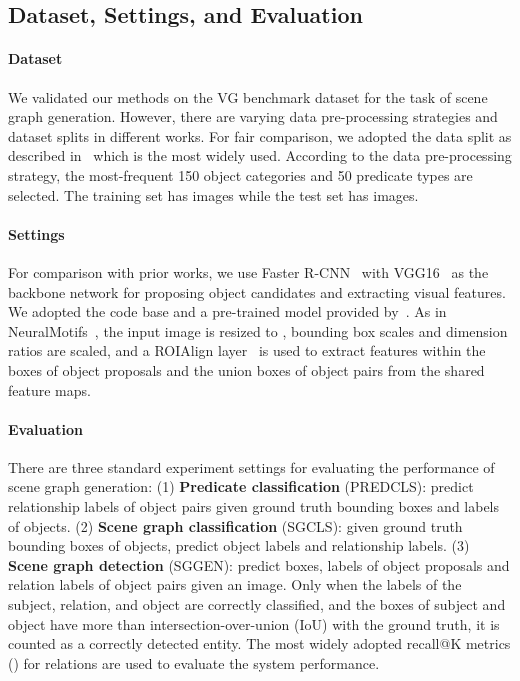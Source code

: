 \documentclass[runningheads]{llncs}
\begin{document}
\subsection{Dataset, Settings, and Evaluation}
\paragraph{Dataset}
We validated our methods on the VG benchmark dataset \cite{krishna2017visual} for the task of scene graph generation.
However, there are varying data pre-processing strategies and dataset splits in different works.
For fair comparison, we adopted the data split as described in~\cite{xu2017scene} which is the most widely used.
According to the data pre-processing strategy, the most-frequent 150 object categories and 50 predicate types are selected. The training set has  images while the test set has  images.

\paragraph{Settings}
For comparison with prior works, we use Faster R-CNN~\cite{ren2015faster} with VGG16~\cite{simonyan2014very} as the backbone network for proposing object candidates and extracting visual features.
We adopted the code base and a pre-trained model provided by~\cite{zellers2018neural}.
As in NeuralMotifs~\cite{zellers2018neural}, the input image is resized to , bounding box scales and dimension ratios are scaled, and a ROIAlign layer~\cite{He2017:MaskRCNN} is used to extract features within the boxes of object proposals and the union boxes of object pairs from the shared feature maps. 



\paragraph{Evaluation}
There are three standard experiment settings for evaluating the performance of scene graph generation:
(1) \textbf{Predicate classification} (PREDCLS): predict relationship labels of object pairs given ground truth bounding boxes and labels of objects.
(2) \textbf{Scene graph classification} (SGCLS):  given ground truth bounding boxes of objects, predict object labels and relationship labels. 
(3) \textbf{Scene graph detection} (SGGEN): predict boxes, labels of object proposals and relation labels of object pairs given an image.
Only when the labels of the subject, relation, and object are correctly classified, and the boxes of subject and object have more than  intersection-over-union (IoU) with the ground truth, it is counted as a correctly detected entity.
The most widely adopted recall@K metrics () for relations are used to evaluate the system performance.
\end{document}
